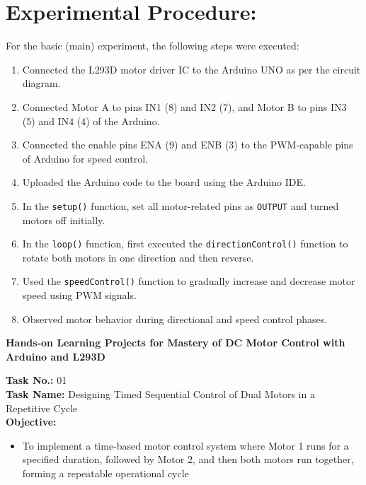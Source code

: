 \documentclass[a4paper,12pt]{article}
\begin{document}
	
	
	
	
	
	\section*{Experimental Procedure:}
		For the basic (main) experiment, the following steps were executed:
	\begin{enumerate}
		\item Connected the L293D motor driver IC to the Arduino UNO as per the circuit diagram.
		\item Connected Motor A to pins IN1 (8) and IN2 (7), and Motor B to pins IN3 (5) and IN4 (4) of the Arduino.
		\item Connected the enable pins ENA (9) and ENB (3) to the PWM-capable pins of Arduino for speed control.
		\item Uploaded the Arduino code to the board using the Arduino IDE.
		\item In the \texttt{setup()} function, set all motor-related pins as \texttt{OUTPUT} and turned motors off initially.
		\item In the \texttt{loop()} function, first executed the \texttt{directionControl()} function to rotate both motors in one direction and then reverse.
		\item Used the \texttt{speedControl()} function to gradually increase and decrease motor speed using PWM signals.
		\item Observed motor behavior during directional and speed control phases.
	\end{enumerate}
	
	\newpage
	\begin{center}
		\textbf{Hands-on Learning Projects for Mastery of DC Motor Control with Arduino and L293D}
	\end{center}
	
\textbf{Task No.:} 01 \\
\textbf{	Task Name:} Designing Timed Sequential Control of Dual Motors in a Repetitive Cycle\\
	
		\textbf{Objective:}
	
	
	\begin{itemize}
		\item To implement a time-based motor control system where Motor 1 runs for a specified
		duration, followed by Motor 2, and then both motors run together, forming a repeatable
		operational cycle
	\end{itemize}
	
\end{document}
